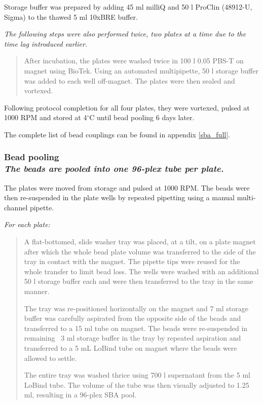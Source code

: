 \documentclass{article}
\begin{document}
Storage buffer was prepared by adding 45 ml milliQ and 50 \textmu l ProClin (48912-U, Sigma) to the thawed 5 ml 10xBRE buffer. 

\textit{The following steps were also performed twice, two plates at a time due to the time lag introduced earlier.}
\begin{quote}
After incubation, the plates were washed twice in 100 \textmu l 0.05 PBS-T on magnet using BioTek. Using an automated multipipette, 50 \textmu l storage buffer was added to each well off-magnet. The plates were then sealed and vortexed.
\end{quote}
Following protocol completion for all four plates, they were vortexed, pulsed at 1000 RPM and stored at 4$^{\circ}$C until bead pooling 6 days later.

The complete list of bead couplings can be found in appendix \ref{sba_full}.

\subsubsection[Bead pooling]{Bead pooling\\{\normalfont\slshape\normalsize The beads are pooled into one 96-plex tube per plate.}}\label{bead_pooling}

The plates were moved from storage and pulsed at 1000 RPM. The beads were then re-suspended in the plate wells by repeated pipetting using a manual multi-channel pipette.

\textit{For each plate:}
\begin{quote}
    A flat-bottomed, slide washer tray was placed, at a tilt, on a plate magnet after which the whole bead plate volume was transferred to the side of the tray in contact with the magnet. The pipette tips were reused for the whole transfer to limit bead loss. The wells were washed with an additional 50 \textmu l storage buffer each and were then transferred to the tray in the same manner.
    
    The tray was re-positioned horizontally on the magnet and 7 ml storage buffer was carefully aspirated from the opposite side of the beads and transferred to a 15 ml tube on magnet. The beads were re-suspended in remaining ~3 ml storage buffer in the tray by repeated aspiration and transferred to a 5 mL LoBind tube on magnet where the beads were allowed to settle.
    
    The entire tray was washed thrice using 700 \textmu l supernatant from the 5 ml LoBind tube. The volume of the tube was then visually adjusted to 1.25 ml, resulting in a 96-plex SBA pool.
\end{quote}
\end{document}
